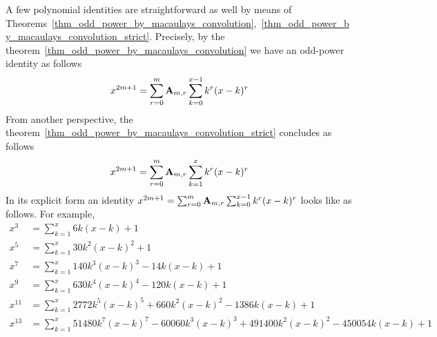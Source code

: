A few polynomial identities are straightforward as well by means of
Theorems~\ref{thm_odd_power_by_macaulays_convolution},~\ref{thm_odd_power_by_macaulays_convolution_strict}.
Precisely, by the theorem~\ref{thm_odd_power_by_macaulays_convolution} we have an odd-power identity as follows
\begin{equation*}
    x^{2m+1} = \sum_{r=0}^{m} {\mathbf{A}} \sb{m,r} \sum_{k=0}^{x-1} k^r (x-k)^r
\end{equation*}
From another perspective, the theorem~\ref{thm_odd_power_by_macaulays_convolution_strict} concludes as follows
\begin{equation*}
    x^{2m+1} = \sum_{r=0}^{m} {\mathbf{A}} \sb{m,r} \sum_{k=1}^{x} k^r (x-k)^r
\end{equation*}
In its explicit form an identity $x^{2m+1} = \sum_{r=0}^{m} {\mathbf{A}} \sb{m,r} \sum_{k=0}^{x-1} k^r (x-k)^r$ looks like
as follows.
For example,
\begin{align*}
    x^3 &= \sum_{k=1}^{x} 6k (x-k) + 1 \\
    x^5 &= \sum_{k=1}^{x} 30k^2 (x-k)^2 + 1 \\
    x^7 &= \sum_{k=1}^{x} 140 k^3 (x-k)^3 - 14k(x-k) + 1 \\
    x^9 &= \sum_{k=1}^{x} 630 k^4(x-k)^4 - 120k(x-k) + 1 \\
    x^{11} &= \sum_{k=1}^{x} 2772 k^5 (x-k)^5 + 660 k^2(x-k)^2 - 1386k(x-k) + 1 \\
    x^{13} &= \sum_{k=1}^{x} 51480 k^7 (x-k)^7 - 60060 k^3 (x-k)^3 + 491400 k^2 (x-k)^{2} - 450054 k (x-k) + 1 \\
\end{align*}
